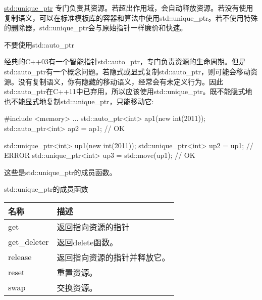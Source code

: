 
\href{http://en.cppreference.com/w/cpp/memory/unique_ptr}{std::unique\_ptr} 专门负责其资源。若超出作用域，会自动释放资源。若没有使用复制语义，可以在标准模板库的容器和算法中使用std::unique\_ptr。若不使用特殊的删除器，std::unique\_ptr会与原始指针一样廉价和快速。

\begin{myWarning}{不要使用std::auto\_ptr}

经典的C++03有一个智能指针std::auto\_ptr，专门负责资源的生命周期。但是std::auto\_ptr有一个概念问题。若隐式或显式复制std::auto\_ptr，则可能会移动资源。没有复制语义，你有隐藏的移动语义，经常会有未定义行为。因此std::auto\_ptr在C++11中已弃用，所以应该使用std::unique\_ptr。既不能隐式地也不能显式地复制std::unique\_ptr，只能移动它:

\begin{cpp}
#include <memory>
...
std::auto_ptr<int> ap1(new int(2011));
std::auto_ptr<int> ap2 = ap1; // OK

std::unique_ptr<int> up1(new int(2011));
std::unique_ptr<int> up2 = up1; // ERROR
std::unique_ptr<int> up3 = std::move(up1); // OK
\end{cpp}

\end{myWarning}

这些是std::unique\_ptr的成员函数。

\begin{center}
std::unique\_ptr的成员函数
\end{center}

\begin{longtable}[c]{|l|l|}
\hline
名称         & 描述                                       \\ \hline
\endfirsthead
%
\endhead
%
get          & 返回指向资源的指针                 \\ \hline
get\_deleter & 返回delete函数。                      \\ \hline
release      & 返回指向资源的指针并释放它。 \\ \hline
reset        & 重置资源。                              \\ \hline
swap         & 交换资源。                                \\ \hline
\end{longtable}

